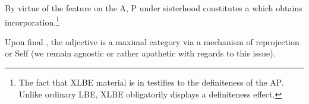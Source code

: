 \documentclass[output=paper]{langsci/langscibook}
\begin{document}
By virtue of the \Def{} feature on the A, P under sisterhood
constitutes a  which obtains incorporation.\footnote{The
    fact that XLBE material is in  testifies to the definiteness of
    the AP. Unlike ordinary \gls{LBE}, XLBE
obligatorily displays a definiteness effect.}

\begin{exe}
	\ex

	\hfill\null
	\label{der3}
\end{exe}

Upon final , the adjective is a maximal category via a mechanism
of reprojection or Self  (we remain agnostic or rather apathetic
with regards to this issue).
\end{document}
